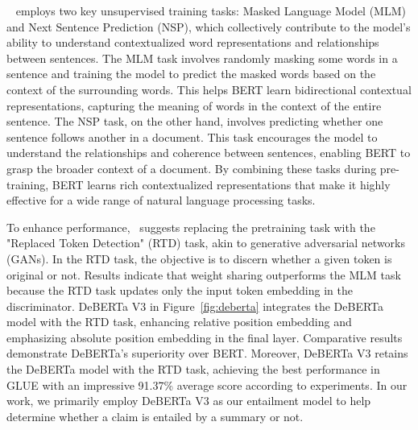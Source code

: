 ~\citet{devlin2019bert} employs two key unsupervised training tasks: Masked Language Model (MLM) and Next Sentence Prediction (NSP), which collectively contribute to the model's ability to understand contextualized word representations and relationships between sentences. The MLM task involves randomly masking some words in a sentence and training the model to predict the masked words based on the context of the surrounding words. This helps BERT learn bidirectional contextual representations, capturing the meaning of words in the context of the entire sentence. The NSP task, on the other hand, involves predicting whether one sentence follows another in a document. This task encourages the model to understand the relationships and coherence between sentences, enabling BERT to grasp the broader context of a document. By combining these tasks during pre-training, BERT learns rich contextualized representations that make it highly effective for a wide range of natural language processing tasks.

To enhance performance,~\citet{clark2020electra} suggests replacing the pretraining task with the "Replaced Token Detection" (RTD) task, akin to generative adversarial networks (GANs). In the RTD task, the objective is to discern whether a given token is original or not. Results indicate that weight sharing outperforms the MLM task because the RTD task updates only the input token embedding in the discriminator. DeBERTa V3 in Figure~\ref{fig:deberta} integrates the DeBERTa model with the RTD task, enhancing relative position embedding and emphasizing absolute position embedding in the final layer. Comparative results demonstrate DeBERTa's superiority over BERT. Moreover, DeBERTa V3 retains the DeBERTa model with the RTD task, achieving the best performance in GLUE with an impressive 91.37\% average score according to experiments. In our work, we primarily employ DeBERTa V3 as our entailment model to help determine whether a claim is entailed by a summary or not.